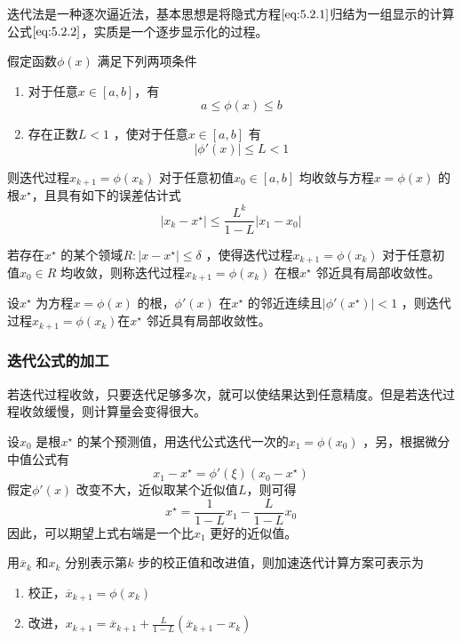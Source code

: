 \documentclass[a4paper]{article}
\begin{document}
迭代法是一种逐次逼近法，基本思想是将隐式方程$\ref{eq:5.2.1}$归结为一组显示的计算公式$\ref{eq:5.2.2}$，实质是一个逐步显示化的过程。

\begin{definition}
	假定函数$\phi(x)$ 满足下列两项条件
	\begin{enumerate}
		\item 对于任意$x \in [a,b]$，有
			\[
			a \le \phi(x) \le b \tag{5.2.3} \label{eq:5.2.3} 
			\] 
		\item 存在正数$L < 1$ ，使对于任意$x \in [a,b]$ 有
			\[
			| \phi'(x) | \le L < 1 \tag{5.2.4} \label{eq:5.2.4} 
			\] 
	\end{enumerate}
	则迭代过程$x_{k+1} = \phi(x_{k})$ 对于任意初值$x_0 \in [a,b]$ 均收敛与方程$x = \phi(x)$ 的根$x^{\star}$，且具有如下的误差估计式
	\[
	| x_{k} - x^{\star} | \le \frac{L^{k}}{1 - L} | x_{1} - x_0 | \tag{5.2.5} \label{eq:5.2.5} 
	\] 
\end{definition}

\begin{definition}
	若存在$x^{\star}$ 的某个领域$R: | x - x^{\star} | \le \delta$ ，使得迭代过程$x_{k+1} = \phi(x_{k})$ 对于任意初值$x_0 \in R$ 均收敛，则称迭代过程$x_{k+1} = \phi(x_{k})$ 在根$x^{\star}$ 邻近具有局部收敛性。
\end{definition}

\begin{theorem}
	设$x^{\star}$ 为方程$x = \phi(x)$ 的根，$\phi'(x)$ 在$x^{\star}$ 的邻近连续且$|\phi'(x^{\star})| < 1$ ，则迭代过程$x_{k+1} = \phi(x_{k})$在$x^{\star}$ 邻近具有局部收敛性。
\end{theorem}

\subsubsection{迭代公式的加工}
若迭代过程收敛，只要迭代足够多次，就可以使结果达到任意精度。但是若迭代过程收敛缓慢，则计算量会变得很大。

设$x_0$ 是根$x^{\star}$ 的某个预测值，用迭代公式迭代一次的$x_1 = \phi(x_0)$ ，另，根据微分中值公式有
\[
x_1 - x^{\star} = \phi'(\xi) (x_0 - x^{\star})
\] 
假定$\phi'(x)$ 改变不大，近似取某个近似值$L$，则可得
\[
x^{\star} = \frac{1}{1 - L} x_1 - \frac{L}{1 - L} x_0 \tag{5.2.6} \label{eq:5.2.6} 
\] 
因此，可以期望上式右端是一个比$x_1$ 更好的近似值。

用$\overline{x}_k$ 和$x_{k}$ 分别表示第$k$ 步的校正值和改进值，则加速迭代计算方案可表示为
\begin{enumerate}
	\item 校正，$ \overline{x}_{k+1} = \phi(x_{k})$
	\item 改进，$x_{k+1} = \overline{x}_{k+1} + \frac{L}{1-L}(\overline{x}_{k+1} - x_{k})$
\end{enumerate}
\end{document}
